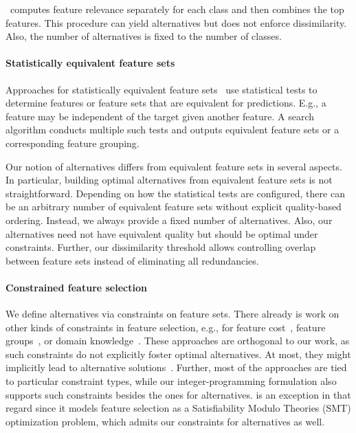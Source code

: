 \documentclass{article}
\theoremstyle{definition}
\begin{document}
\cite{guru2018alternative}~computes feature relevance separately for each class and then combines the top features.
This procedure can yield alternatives but does not enforce dissimilarity.
Also, the number of alternatives is fixed to the number of classes.

\paragraph{Statistically equivalent feature sets}

Approaches for statistically equivalent feature sets~\cite{borboudakis2021extending, lagani2017feature} use statistical tests to determine features or feature sets that are equivalent for predictions.
E.g., a feature may be independent of the target given another feature.
A search algorithm conducts multiple such tests and outputs equivalent feature sets or a corresponding feature grouping.

Our notion of alternatives differs from equivalent feature sets in several aspects.
In particular, building optimal alternatives from equivalent feature sets is not straightforward.
Depending on how the statistical tests are configured, there can be an arbitrary number of equivalent feature sets without explicit quality-based ordering.
Instead, we always provide a fixed number of alternatives.
Also, our alternatives need not have equivalent quality but should be optimal under constraints.
Further, our dissimilarity threshold allows controlling overlap between feature sets instead of eliminating all redundancies.

\paragraph{Constrained feature selection}

We define alternatives via constraints on feature sets.
There already is work on other kinds of constraints in feature selection, e.g., for feature cost~\cite{paclik2002feature}, feature groups~\cite{yuan2006model}, or domain knowledge~\cite{bach2022empirical, groves2015toward}.
These approaches are orthogonal to our work, as such constraints do not explicitly foster optimal alternatives.
At most, they might implicitly lead to alternative solutions~\cite{bach2022empirical}.
Further, most of the approaches are tied to particular constraint types, while our integer-programming formulation also supports such constraints besides the ones for alternatives.
\cite{bach2022empirical} is an exception in that regard since it models feature selection as a Satisfiability Modulo Theories (\textsc{SMT}) optimization problem, which admits our constraints for alternatives as well.
\end{document}
